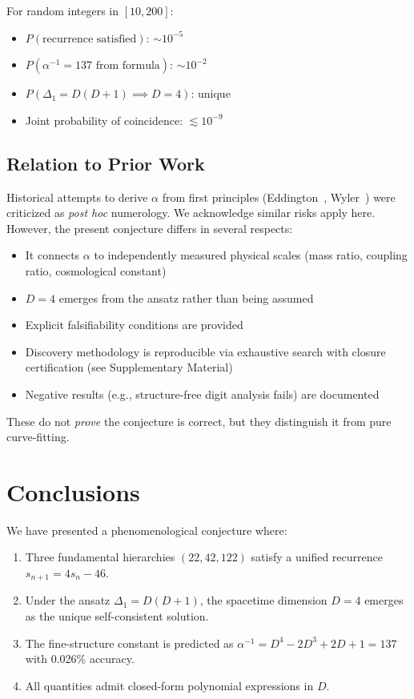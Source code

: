 \documentclass[11pt,a4paper]{article}
\begin{document}
For random integers in $[10, 200]$:
\begin{itemize}
\item $P(\text{recurrence satisfied})$: $\sim 10^{-5}$
\item $P(\alpha^{-1} = 137 \text{ from formula})$: $\sim 10^{-2}$
\item $P(\Delta_1 = D(D+1) \implies D=4)$: unique
\item Joint probability of coincidence: $\lesssim 10^{-9}$
\end{itemize}

\subsection{Relation to Prior Work}

Historical attempts to derive $\alpha$ from first principles 
(Eddington~\cite{eddington}, Wyler~\cite{wyler}) were criticized as 
\emph{post hoc} numerology. We acknowledge similar risks apply here. 
However, the present conjecture differs in several respects:
\begin{itemize}
\item It connects $\alpha$ to independently measured physical scales 
(mass ratio, coupling ratio, cosmological constant)
\item $D = 4$ emerges from the ansatz rather than being assumed
\item Explicit falsifiability conditions are provided
\item Discovery methodology is reproducible via exhaustive search with 
closure certification (see Supplementary Material)
\item Negative results (e.g., structure-free digit analysis fails) 
are documented
\end{itemize}
These do not \emph{prove} the conjecture is correct, but they distinguish 
it from pure curve-fitting.

\section{Conclusions}

We have presented a phenomenological conjecture where:

\begin{enumerate}
\item Three fundamental hierarchies $(22, 42, 122)$ satisfy a unified 
recurrence $s_{n+1} = 4s_n - 46$.

\item Under the ansatz $\Delta_1 = D(D+1)$, the spacetime dimension $D = 4$ 
emerges as the unique self-consistent solution.

\item The fine-structure constant is predicted as $\alpha^{-1} = D^4 - 2D^3 + 2D + 1 = 137$ 
with 0.026\% accuracy.

\item All quantities admit closed-form polynomial expressions in $D$.
\end{enumerate}
\end{document}
